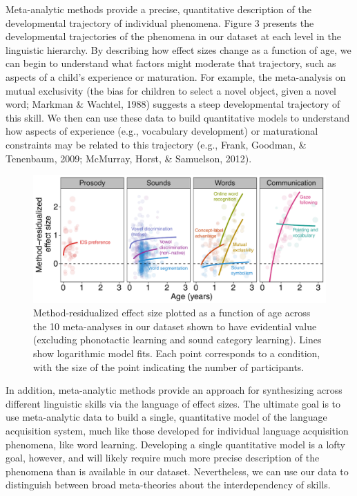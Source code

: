\documentclass[9pt,twocolumn,twoside,lineno]{pnas-new}
\begin{document}
Meta-analytic methods provide a precise, quantitative description of the
developmental trajectory of individual phenomena. Figure 3 presents the
developmental trajectories of the phenomena in our dataset at each level
in the linguistic hierarchy. By describing how effect sizes change as a
function of age, we can begin to understand what factors might moderate
that trajectory, such as aspects of a child's experience or maturation.
For example, the meta-analysis on mutual exclusivity (the bias for
children to select a novel object, given a novel word; Markman \&
Wachtel, 1988) suggests a steep developmental trajectory of this skill.
We then can use these data to build quantitative models to understand
how aspects of experience (e.g., vocabulary development) or maturational
constraints may be related to this trajectory (e.g., Frank, Goodman, \&
Tenenbaum, 2009; McMurray, Horst, \& Samuelson, 2012).

\begin{figure}[t!]
\centering
\includegraphics[width=17.3cm]{figs/fig3_lab.pdf}
\caption{Method-residualized effect size plotted as a function of age
across the 10 meta-analyses in our dataset shown to have evidential
value (excluding phonotactic learning and sound category learning).
Lines show logarithmic model fits. Each point corresponds to a
condition, with the size of the point indicating the number of
participants.}
\end{figure}



In addition, meta-analytic methods provide an approach for synthesizing
across different linguistic skills via the language of effect sizes. The
ultimate goal is to use meta-analytic data to build a single,
quantitative model of the language acquisition system, much like those
developed for individual language acquisition phenomena, like word
learning. Developing a single quantitative model is a lofty goal,
however, and will likely require much more precise description of the
phenomena than is available in our dataset. Nevertheless, we can use our
data to distinguish between broad meta-theories about the
interdependency of skills.
\end{document}
